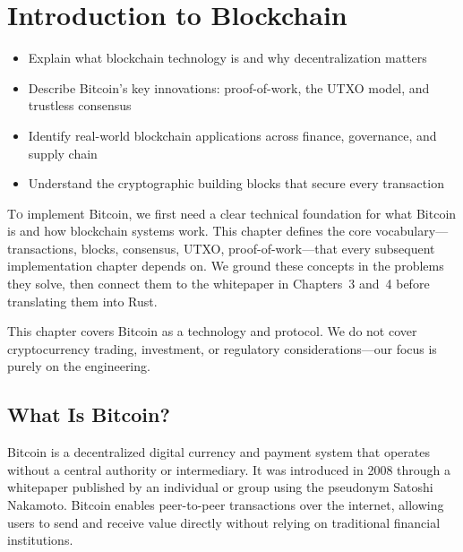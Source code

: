 \chapter{Introduction to Blockchain}
\label{ch:blockchain-intro}

\begin{learnbox}
\begin{itemize}
  \item Explain what blockchain technology is and why decentralization matters
  \item Describe Bitcoin's key innovations: proof-of-work, the UTXO model, and trustless consensus
  \item Identify real-world blockchain applications across finance, governance, and supply chain
  \item Understand the cryptographic building blocks that secure every transaction
\end{itemize}
\end{learnbox}

\lettrine{T}{o} implement Bitcoin, we first need a clear technical foundation for what Bitcoin is and how blockchain systems work. This chapter defines the core vocabulary---transactions, blocks, consensus, UTXO, proof-of-work---that every subsequent implementation chapter depends on. We ground these concepts in the problems they solve, then connect them to the whitepaper in Chapters~3 and~4 before translating them into Rust.

\begin{notebox}
This chapter covers Bitcoin as a technology and protocol. We do not cover cryptocurrency trading, investment, or regulatory considerations---our focus is purely on the engineering.
\end{notebox}

\section{What Is Bitcoin?}
\label{sec:what-is-bitcoin}

Bitcoin is a decentralized digital currency and payment system that operates without a central authority or intermediary. It was introduced in 2008 through a whitepaper published by an individual or group using the pseudonym Satoshi Nakamoto. Bitcoin enables peer-to-peer transactions over the internet, allowing users to send and receive value directly without relying on traditional financial institutions.


